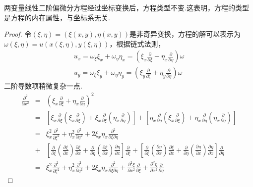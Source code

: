 	\begin{mylemma}
		两变量线性二阶偏微分方程经过坐标变换后，方程类型不变.这表明，方程的类型是方程的内在属性，与坐标系无关.
	\end{mylemma}
	\begin{proof}
		令$(\xi,\eta)=(\xi(x,y),\eta(x,y))$是非奇异变换，方程的解可以表示为$\omega(\xi,\eta)=u(x(\xi,\eta),y(\xi,\eta))$，根据链式法则，
		\begin{eqnarray}
			u_x = \omega_{\xi}\xi_x + \omega_{\eta}\eta_x = \left(\xi_x \frac{\partial}{\partial \xi} + \eta_x \frac{\partial}{\partial \eta}\right) \omega \\
			u_y = \omega_{\xi}\xi_y + \omega_{\eta}\eta_y	= \left(\xi_y \frac{\partial}{\partial \xi}  + \eta_y \frac{\partial}{\partial \eta}\right)	\omega		
		\end{eqnarray}
		二阶导数项稍微复杂一点.
		\begin{eqnarray}
			\frac{\partial^2}{\partial x^2} & = & \left(\xi_x \frac{\partial}{\partial \xi} + \eta_x \frac{\partial}{\partial \eta}\right)^2  \nonumber  \\
			& = & \left[ 
			\xi_x \frac{\partial}{\partial \xi}\left(\xi_x  \frac{\partial}{\partial \xi}\right) + \xi_x \frac{\partial}{\partial \xi}\left(\eta_x  \frac{\partial}{\partial \eta}\right)
			\right]  +  	
			\left[ 
			\eta_x \frac{\partial}{\partial \eta}\left(\xi_x  \frac{\partial}{\partial \xi}\right) + \eta_x \frac{\partial}{\partial \eta}\left(\eta_x  \frac{\partial}{\partial \eta}\right)
			\right]  \nonumber \\
			& = & 
			\xi_{x}^2 \frac{\partial^2}{\partial \xi^2} + \eta_{x}^2 \frac{\partial^2}{\partial \eta^2} + 2\xi_x \eta_x \frac{\partial^2}{\partial \xi \partial \eta} \nonumber \\
			& + &			
			\left[ \frac{\partial}{\partial \xi}\left(\frac{\partial \xi}{\partial x}\right) \frac{\partial \xi}{\partial x} + \frac{\partial}{\partial \eta}\left(\frac{\partial \xi}{\partial x}\right) \frac{\partial \eta}{\partial x}\right] \frac{\partial}{\partial \xi} +
			\left[ \frac{\partial}{\partial \xi}\left(\frac{\partial \eta}{\partial x}\right) \frac{\partial \xi}{\partial x} + \frac{\partial}{\partial \eta}\left(\frac{\partial \eta}{\partial x}\right) \frac{\partial \eta}{\partial x}\right] \frac{\partial}{\partial \eta} \nonumber \\
			& = &
			\xi_{x}^2 \frac{\partial^2}{\partial \xi^2} + \eta_{x}^2 \frac{\partial^2}{\partial \eta^2} + 2\xi_x \eta_x \frac{\partial^2}{\partial \xi \partial \eta} + \frac{\partial^2 \xi}{\partial x^2} \frac{\partial}{\partial \xi} + \frac{\partial^2 \eta}{\partial x^2} \frac{\partial}{\partial \eta}

\end{eqnarray}
\end{proof}
